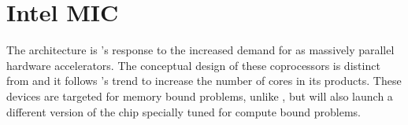 \documentclass[../thesis]{subfiles}
\begin{document}
	\chapter{Intel MIC}
	\label{chp:mic}

	The \mic architecture \cite{Intel:XeonPhi:DevGuide} is \intel's response to the increased demand for \gpgpus as massively parallel hardware accelerators. The conceptual design of these coprocessors is distinct from \gpgpus and it follows \intel's trend to increase the number of cores in its products. These devices are targeted for memory bound problems, unlike \gpus, but \intel will also launch a different version of the chip specially tuned for compute bound problems.

	
	
	
	
	
\end{document}
